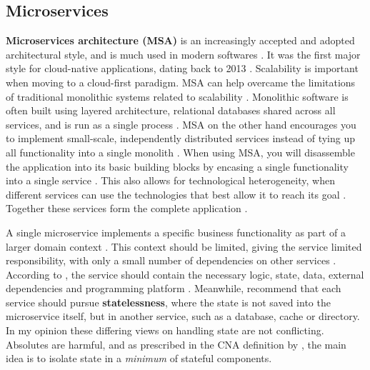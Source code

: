 \documentclass[utf8,english]{gradu3}
\begin{document}
\subsection{Microservices}

\textbf{Microservices architecture (MSA)} is an increasingly accepted and
adopted architectural style, and is much used in modern softwares
\parencite[10]{Vale2022}. It was the first major style for cloud-native
applications, dating back to 2013 \parencite[18]{Gannon2017}. Scalability is
important when moving to a cloud-first paradigm. MSA can help overcame the
limitations of traditional monolithic systems related to scalability
\parencite[10]{Vale2022}. Monolithic software is often built using layered
architecture, relational databases shared across all services, and is run as a
single process \parencite{Microsoft2022-CNA}. MSA on the other hand encourages you
to implement small-scale, independently distributed services instead of tying up
all functionality into a single monolith \parencite[1]{Li2021}. When using MSA,
you will disassemble the application into its basic building blocks by encasing
a single functionality into a single service \parencite[18]{Gannon2017}. This
also allows for technological heterogeneity, when different services can use the
technologies that best allow it to reach its goal \parencite[18]{Li2021}.
Together these services form the complete application \parencite{Microsoft2022-CNA}.

A single microservice implements a specific business functionality as part of a
larger domain context \parencite{Microsoft2022-CNA}. This context should be limited,
giving the service limited responsibility, with only a small number of
dependencies on other services \parencite[18]{Gannon2017}. According to
\textcite{Microsoft2022-CNA}, the service should contain the necessary logic, state,
data, external dependencies and programming platform \parencite{Microsoft2022-CNA}.
Meanwhile, \textcite[18]{Gannon2017} recommend that each service should pursue
\textbf{statelessness}, where the state is not saved into the microservice
itself, but in another service, such as a database, cache or directory. In my
opinion these differing views on handling state are not conflicting. Absolutes
are harmful, and as prescribed in the CNA definition by
\textcite[13]{Kratzke2017}, the main idea is to isolate state in a
\textit{minimum} of stateful components.
\end{document}
